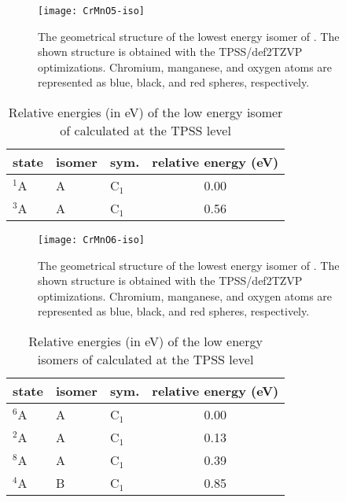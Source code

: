 \begin{figure}
	\centering
	\texttt{[image: CrMnO5-iso]}
	\caption{The geometrical structure of the lowest energy isomer of . The shown structure is obtained with the TPSS/def2TZVP optimizations. Chromium, manganese, and oxygen atoms are represented as blue, black, and red spheres, respectively.}
	\label{figs:CrMnO5}
\end{figure}






\begin{table}[]
	\centering
	\caption{Relative energies (in eV) of the low energy isomer of  calculated at the TPSS level}
	\begin{tabular}{@{}lllc@{}}
	\toprule
	state 	 & isomer & sym. 	& relative energy (eV) \\ \midrule
	$^1$A    & A      & C$_1$   & 0.00                 \\
	$^3$A    & A      & C$_1$   & 0.56                 \\ \bottomrule
	\end{tabular}
\end{table}
		




\begin{figure}
	\centering
	\texttt{[image: CrMnO6-iso]}
	\caption{The geometrical structure of the lowest energy isomer of . The shown structure is obtained with the TPSS/def2TZVP optimizations. Chromium, manganese, and oxygen atoms are represented as blue, black, and red spheres, respectively.}
	\label{figs:CrMnO6}
\end{figure}






\begin{table}[]
	\centering
	\caption{Relative energies (in eV) of the low energy isomers of  calculated at the TPSS level}
	\begin{tabular}{@{}lllc@{}}
	\toprule
	state 	 & isomer & sym. 	& relative energy (eV) \\ \midrule
	$^6$A    & A      & C$_1$   & 0.00                 \\
	$^2$A    & A      & C$_1$   & 0.13                 \\
	$^8$A    & A      & C$_1$   & 0.39                 \\
	$^4$A    & B      & C$_1$   & 0.85                 \\ \bottomrule
	\end{tabular}
\end{table}



